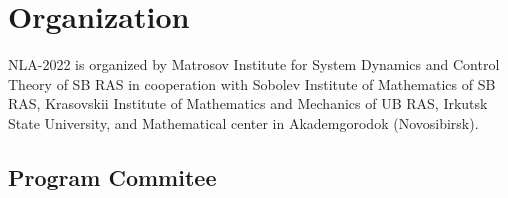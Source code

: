 \documentclass[12pt,final]{llncs}
\begin{document}
%
\chapter*{Organization}
\vspace{-2em}
 \begin{englisharticle}
NLA-2022 is organized by Matrosov
Institute for System Dynamics and Control Theory of SB RAS in cooperation with
Sobolev Institute of Mathematics  of SB RAS,
  Krasovskii Institute of Mathematics and Mechanics of UB RAS,
 	Irkutsk State University, and Mathematical center in Akademgorodok (Novosibirsk).
 \end{englisharticle}


%
\vspace{-1em}
\section*{Program Commitee}
\end{document}
